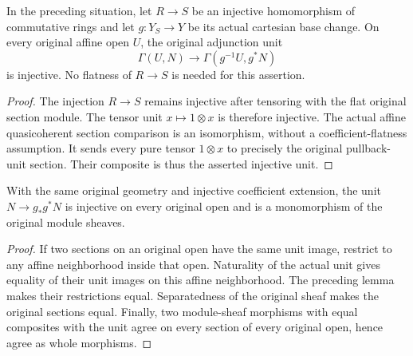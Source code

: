 \begin{lemma}
\label{lem:kn-original-line-affine-unit-injective}
\leanok
{}
In the preceding situation, let $R\to S$ be an injective homomorphism
of commutative rings and let $g:Y_S\to Y$ be its actual cartesian base
change.  On every original affine open $U$, the original adjunction unit
\[
 \Gamma(U,N)\longrightarrow\Gamma(g^{-1}U,g^*N)
\]
is injective.  No flatness of $R\to S$ is needed for this assertion.
\end{lemma}
\begin{proof}
The injection $R\to S$ remains injective after tensoring with the flat
original section module.  The tensor unit $x\mapsto1\otimes x$ is therefore
injective.  The actual affine quasicoherent section comparison is an
isomorphism, without a coefficient-flatness assumption.  It sends every
pure tensor $1\otimes x$ to precisely the original pullback-unit section.
Their composite is thus the asserted injective unit.
\end{proof}

\begin{lemma}
\label{lem:kn-original-line-unit-mono}
\leanok
{}
With the same original geometry and injective coefficient extension, the
unit $N\to g_*g^*N$ is injective on every original open and is a monomorphism
of the original module sheaves.
\end{lemma}
\begin{proof}
If two sections on an original open have the same unit image, restrict
to any affine neighborhood inside that open.  Naturality of the actual
unit gives equality of their unit images on this affine neighborhood.
The preceding lemma makes their restrictions equal.  Separatedness of
the original sheaf makes the original sections equal.  Finally, two
module-sheaf morphisms with equal composites with the unit agree on
every section of every original open, hence agree as whole morphisms.
\end{proof}

